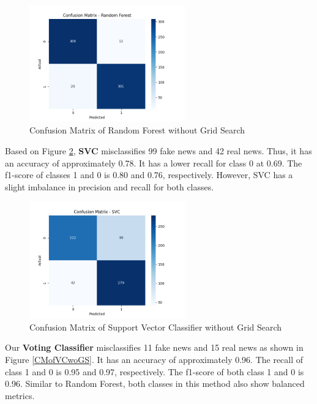 \begin{figure}[ht]
\centering
\includegraphics[width=0.6\textwidth,height=0.6\textheight, keepaspectratio]{figures/withoutgridsearch/RF.png}
  \caption{Confusion Matrix of Random Forest without Grid Search}
  \label{CMofRFwoGS}
\end{figure}

Based on Figure \ref{CMofSVCwoGS}, \textbf{SVC} misclassifies 99 fake news and 42 real news. Thus, it has an accuracy of approximately 0.78. It has a lower recall for class 0 at 0.69. The f1-score of classes 1 and 0 is 0.80 and 0.76, respectively. However, SVC has a slight imbalance in precision and recall for both classes.

\begin{figure}[ht]
\centering
\includegraphics[width=0.6\textwidth,height=0.6\textheight, keepaspectratio]{figures/withoutgridsearch/SVC.png}
  \caption{Confusion Matrix of Support Vector Classifier without Grid Search}
  \label{CMofSVCwoGS}
\end{figure}

\clearpage

Our \textbf{Voting Classifier} misclassifies 11 fake news and 15 real news as shown in Figure \ref{CMofVCwoGS}. It has an accuracy of approximately 0.96. The recall of class 1 and 0 is 0.95 and 0.97, respectively. The f1-score of both class 1 and 0 is 0.96. Similar to Random Forest, both classes in this method also show balanced metrics.

